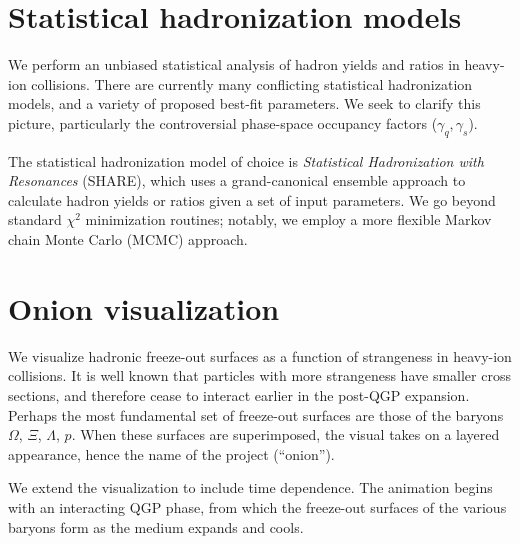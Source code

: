 \documentclass[letterpaper,10pt]{article}
\begin{document}
\section{Statistical hadronization models}

We perform an unbiased statistical analysis of hadron yields and ratios in heavy-ion collisions.  There are currently many conflicting statistical hadronization
models, and a variety of proposed best-fit parameters.  We seek to clarify this picture, particularly the controversial phase-space occupancy factors
($\gamma_q,\gamma_s$).

The statistical hadronization model of choice is \emph{Statistical Hadronization with Resonances} (SHARE), which uses a grand-canonical ensemble approach to
calculate hadron yields or ratios given a set of input parameters.  We go beyond standard $\chi^2$ minimization routines; notably, we employ a more flexible
Markov chain Monte Carlo (MCMC) approach.


\medskip{}





\section{Onion visualization}

We visualize hadronic freeze-out surfaces as a function of strangeness in heavy-ion collisions.  It is well known that particles with more strangeness have
smaller cross sections, and therefore cease to interact earlier in the post-QGP expansion.  Perhaps the most fundamental set of freeze-out surfaces are those of
the baryons $\Omega$, $\Xi$, $\Lambda$, $p$.  When these surfaces are superimposed, the visual takes on a layered appearance, hence the name of the project
(``onion'').  

We extend the visualization to include time dependence.  The animation begins with an interacting QGP phase, from which the freeze-out surfaces of the various
baryons form as the medium expands and cools.


\medskip{}
\end{document}
